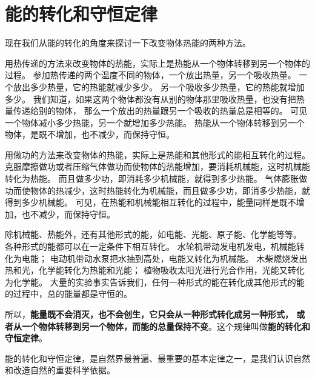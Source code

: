 \section{能的转化和守恒定律}\label{sec:5-6}

现在我们从能的转化的角度来探讨一下改变物体热能的两种方法。

用热传递的方法来改变物体的热能，实际上是热能从一个物体转移到另一个物体的过程。
参加热传递的两个温度不同的物体，一个放出热量，另一个吸收热量。
一个放出多少热量，它的热能就减少多少。
另一个吸收多少热量，它的热能就增加多少。
我们知道，如果这两个物体都没有从别的物体那里吸收热量，也没有把热量传递给别的物体，
那么一个放出的热量跟另一个吸收的热量总是相等的。
可见一个物体减小多少热能，另一个就增加多少热能。
热能从一个物体转移到另一个物体，是既不增加，也不减少，而保持守恒。

用做功的方法来改变物体的热能，实际上是热能和其他形式的能相互转化的过程。
克服摩擦做功或者压缩气体做功而使物体的热能增加，要消耗机械能，这时机械能转化为热能。
而且做多少功，即消耗多少机械能，就得到多少热能。
气体膨胀做功而使物体的热减少，这时热能转化为机械能，而且做多少功，即消多少热能，就得到多少机械能。
可见，在热能和机械能相互转化的过程中，能量同样是既不增加，也不减少，而保持守恒。

除机械能、热能外，还有其他形式的能，如电能、光能、原子能、化学能等等。
各种形式的能都可以在一定条件下相互转化。
水轮机带动发电机发电，机械能转化为电能；
电动机带动水泵把水抽到高处，电能又转化为机械能。
木柴燃烧发出热和光，化学能转化为热能和光能；
植物吸收太阳光进行光合作用，光能又转化为化学能。
大量的实验事实告诉我们，任何一种形式的能在转化成其他形式的能的过程中，总的能量都是守恒的。

所以，\textbf{能量既不会消灭，也不会创生，它只会从一种形式转化成另一种形式，
或者从一个物体转移到另一个物体，而能的总量保持不变}。这个规律叫做\textbf{能的转化和守恒定律}。

能的转化和守恒定律，是自然界最普遍、最重要的基本定律之一，是我们认识自然和改造自然的重要科学依据。

